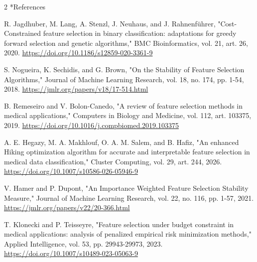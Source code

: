 \documentclass[10pt,a4paper]{article}
\makeatletter
\renewcommand{\section}{\@startsection{section}{1}{0pt}{5pt}{2pt}{\normalfont\normalsize\bfseries}}
\newcommand{\sect}[1]{\section*{#1}}
\makeatother
\begin{document}
\begin{multicols}{2}
\sect{References}
\begin{minipage}{\linewidth}{\fontsize{7}{8.2}\selectfont [1] R. Jagdhuber, M. Lang, A. Stenzl, J. Neuhaus, and J. Rahnenführer, "Cost-Constrained feature selection in binary classification: adaptations for greedy forward selection and genetic algorithms," BMC Bioinformatics, vol. 21, art. 26, 2020. \url{https://doi.org/10.1186/s12859-020-3361-9}\par}\end{minipage}\par
\begin{minipage}{\linewidth}{\fontsize{7}{8.2}\selectfont [2] S. Nogueira, K. Sechidis, and G. Brown, "On the Stability of Feature Selection Algorithms," Journal of Machine Learning Research, vol. 18, no. 174, pp. 1-54, 2018. \url{https://jmlr.org/papers/v18/17-514.html}\par}\end{minipage}\par
\begin{minipage}{\linewidth}{\fontsize{7}{8.2}\selectfont [3] B. Remeseiro and V. Bolon-Canedo, "A review of feature selection methods in medical applications," Computers in Biology and Medicine, vol. 112, art. 103375, 2019. \url{https://doi.org/10.1016/j.compbiomed.2019.103375}\par}\end{minipage}\par
\begin{minipage}{\linewidth}{\fontsize{7}{8.2}\selectfont [4] A. E. Hegazy, M. A. Makhlouf, O. A. M. Salem, and B. Hafiz, "An enhanced Hiking optimization algorithm for accurate and interpretable feature selection in medical data classification," Cluster Computing, vol. 29, art. 244, 2026. \url{https://doi.org/10.1007/s10586-026-05946-9}\par}\end{minipage}\par
\begin{minipage}{\linewidth}{\fontsize{7}{8.2}\selectfont [5] V. Hamer and P. Dupont, "An Importance Weighted Feature Selection Stability Measure," Journal of Machine Learning Research, vol. 22, no. 116, pp. 1-57, 2021. \url{https://jmlr.org/papers/v22/20-366.html}\par}\end{minipage}\par
\begin{minipage}{\linewidth}{\fontsize{7}{8.2}\selectfont [6] T. Klonecki and P. Teisseyre, "Feature selection under budget constraint in medical applications: analysis of penalized empirical risk minimization methods," Applied Intelligence, vol. 53, pp. 29943-29973, 2023. \url{https://doi.org/10.1007/s10489-023-05063-9}\par}\end{minipage}\par

\end{multicols}
\end{document}

